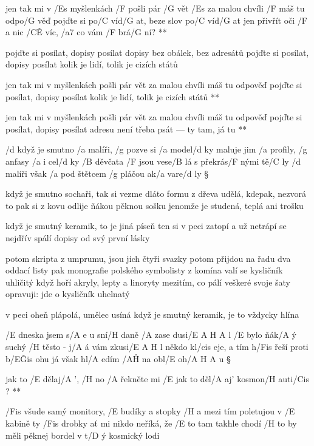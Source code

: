 \R  jen tak mi v /Es myšlenkách /F pošli pár /G vět
    /Es za malou chvíli /F máš tu odpo/G věď
    pojďte si po/C víd/G at, beze slov po/C víd/G at
    jen přivřít oči /F a nic /C\^E víc, /a7 co vám /F brá/G ní? **

pojďte si posílat, dopisy posílat
dopisy bez obálek, bez adresátů
pojďte si posílat, dopisy posílat
kolik je lidí, tolik je cizích států

\R  jen tak mi v myšlenkách pošli pár vět
    za malou chvíli máš tu odpověď
    pojďte si posílat, dopisy posílat
    kolik je lidí, tolik je cizích států **

\R  jen tak mi v myšlenkách pošli pár vět
    za malou chvíli máš tu odpověď
    pojďte si posílat, dopisy posílat
    adresu není třeba psát --- ty tam, já tu **




/d když je smutno /a malíři, /g pozve si /a model/d ky
maluje jim /a profily, /g anfasy /a i cel/d ky
/B děvčata /F jsou vese/B lá s překrás/F nými tě/C ly
/d malíři však /a pod štětcem /g pláčou ak/a vare/d ly \S

když je smutno sochaři, tak si vezme dláto
formu z dřeva udělá, kdepak, nezvorá to
pak si z kovu odlije ňákou pěknou sošku
jenomže je studená, teplá ani trošku \s

když je smutný keramik, to je jiná píseň
ten si v peci zatopí a už netrápí se
nejdřív spálí dopisy od svý první lásky \s

potom skripta z umprumu, jsou jich čtyři svazky
potom přijdou na řadu dva oddací listy
pak monografie polského symbolisty
z komína valí se kysličník uhličitý
když hoří akryly, lepty a linoryty
mezitím, co pálí veškeré svoje šaty
opravuji: jde o kysličník uhelnatý \s
  
v peci oheň plápolá, umělec usíná
když je smutný keramik, je to vždycky hlína




/E dneska jsem s/A e u sní/H daně /A zase dusi/{E A H A} l
/E bylo ňák/A ý suchý /H těsto - j/A á vám zkusi/{E A H} l
někdo kl/cis eje, a tím h/Fis řeší proti b/E\^{Gis} ohu
já však hl/A edím /A\^H na obl/E oh/{A H A} u \S

\R  jak to /E dělaj/A ', /H no /A řekněte mi
    /E jak to děl/A aj' kosmon/H auti/Cis ? **

/Fis všude samý monitory, /E budíky a stopky
/H a mezi tím poletujou v /E kabině ty /Fis drobky
ať mi nikdo neříká, že /E to tam takhle chodí
/H to by měli pěknej bordel v t/D ý kosmický lodi

